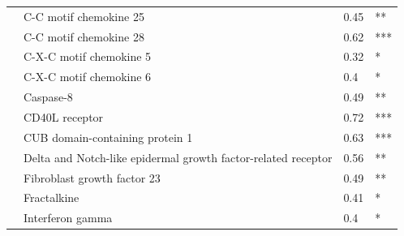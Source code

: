 \begin{table}[ht]
{\begin{tabular}{clll}
                                           & \cellcolor[HTML]{EFEFEF}C-C motif chemokine 25                                        & \cellcolor[HTML]{EFEFEF}0.45       & \cellcolor[HTML]{EFEFEF}**              \\
                                           & \cellcolor[HTML]{EFEFEF}C-C motif chemokine 28                                        & \cellcolor[HTML]{EFEFEF}0.62       & \cellcolor[HTML]{EFEFEF}***             \\
                                           & \cellcolor[HTML]{EFEFEF}C-X-C motif chemokine 5                                       & \cellcolor[HTML]{EFEFEF}0.32       & \cellcolor[HTML]{EFEFEF}*               \\
                                           & C-X-C motif chemokine 6                                                               & 0.4                                & *                                       \\
                                           & Caspase-8                                                                             & 0.49                               & **                                      \\
                                           & CD40L receptor                                                                        & 0.72                               & ***                                     \\
                                           & CUB domain-containing protein 1                                                       & 0.63                               & ***                                     \\
                                           & \cellcolor[HTML]{EFEFEF}Delta and Notch-like epidermal growth factor-related receptor & \cellcolor[HTML]{EFEFEF}0.56       & \cellcolor[HTML]{EFEFEF}**              \\
                                           & \cellcolor[HTML]{EFEFEF}Fibroblast growth factor 23                                   & \cellcolor[HTML]{EFEFEF}0.49       & \cellcolor[HTML]{EFEFEF}**              \\
                                           & \cellcolor[HTML]{EFEFEF}Fractalkine                                                   & \cellcolor[HTML]{EFEFEF}0.41       & \cellcolor[HTML]{EFEFEF}*               \\
                                           & \cellcolor[HTML]{EFEFEF}Interferon gamma                                              & \cellcolor[HTML]{EFEFEF}0.4        & \cellcolor[HTML]{EFEFEF}*               \\

\end{tabular}}
\end{table}
